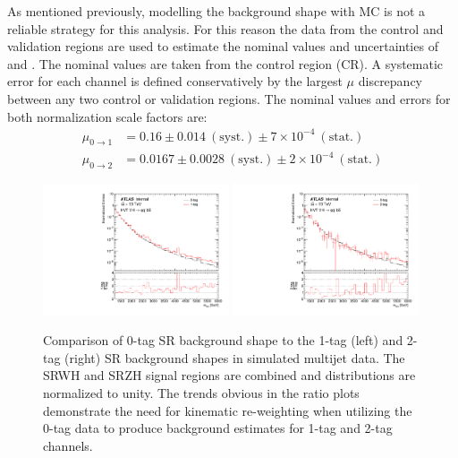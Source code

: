 As mentioned previously, modelling the background shape with MC is not a reliable strategy for this analysis.
For this reason the data from the control and validation regions are used to estimate the nominal values and uncertainties of \muOne and \muTwo.
The nominal values are taken from the control region (CR).
A systematic error for each channel is defined conservatively by the largest $\mu$ discrepancy between any two control or validation regions.
The nominal values and errors for both normalization scale factors are:
\begin{align}
    \mu_{0 \rightarrow 1} &= 0.16 \pm 0.014\ \mathrm{(syst.)} \pm 7 \times 10^{-4}\ \mathrm{(stat.)} \\
    \mu_{0 \rightarrow 2} &= 0.0167 \pm 0.0028\ \mathrm{(syst.)} \pm 2 \times 10^{-4}\ \mathrm{(stat.)}
\end{align}

\begin{figure}[htbp!]
\begin{center}
\includegraphics[width=0.49\textwidth]{VHqqbb_mVH_BTagRatio_0_to_1_MC.pdf}
\includegraphics[width=0.49\textwidth]{VHqqbb_mVH_BTagRatio_0_to_2_MC.pdf}
\end{center}
\caption{Comparison of 0-tag SR background shape to the 1-tag (left) and 2-tag (right) SR background shapes in simulated multijet data.
The SRWH and SRZH signal regions are combined and distributions are normalized to unity.
The trends obvious in the ratio plots demonstrate the need for kinematic re-weighting when utilizing the 0-tag data to produce background estimates for 1-tag and 2-tag channels.
}
\label{fig:bkg_0tag_comp}
\end{figure}

